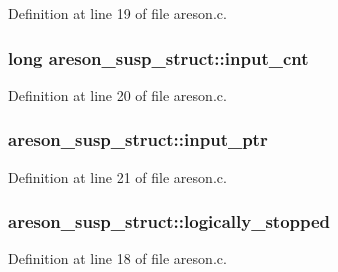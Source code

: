 Definition at line 19 of file areson.\+c.

\subsubsection[{\texorpdfstring{input\+\_\+cnt}{input_cnt}}]{\setlength{\rightskip}{0pt plus 5cm}long areson\+\_\+susp\+\_\+struct\+::input\+\_\+cnt}\hypertarget{structareson__susp__struct_a91b0c2fd22aaab885cc9578fe5eb05f5}{}\label{structareson__susp__struct_a91b0c2fd22aaab885cc9578fe5eb05f5}


Definition at line 20 of file areson.\+c.

\subsubsection[{\texorpdfstring{input\+\_\+ptr}{input_ptr}}]{ areson\+\_\+susp\+\_\+struct\+::input\+\_\+ptr}\hypertarget{structareson__susp__struct_a71e961a1d4e2e4c8d8c484ce3f8c46b2}{}\label{structareson__susp__struct_a71e961a1d4e2e4c8d8c484ce3f8c46b2}


Definition at line 21 of file areson.\+c.

\subsubsection[{\texorpdfstring{logically\+\_\+stopped}{logically_stopped}}]{ areson\+\_\+susp\+\_\+struct\+::logically\+\_\+stopped}\hypertarget{structareson__susp__struct_aabc95561c283c5c1ec203c9ec16f7157}{}\label{structareson__susp__struct_aabc95561c283c5c1ec203c9ec16f7157}


Definition at line 18 of file areson.\+c.

